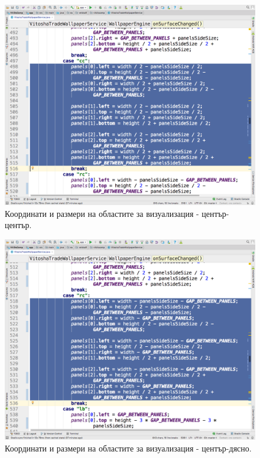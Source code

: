 \documentclass[book,14pt,oneside,openany]{memoir}
\begin{document}
\begin{figure}[h]
  \centering
  \includegraphics[height=0.45\pdfpageheight]{pic0072}
  \caption{Координати и размери на областите за визуализация - център-център.}
\label{fig:pic0072}
\end{figure}
\FloatBarrier

\begin{figure}[h]
  \centering
  \includegraphics[height=0.45\pdfpageheight]{pic0073}
  \caption{Координати и размери на областите за визуализация - център-дясно.}
\label{fig:pic0073}
\end{figure}
\FloatBarrier
\end{document}
